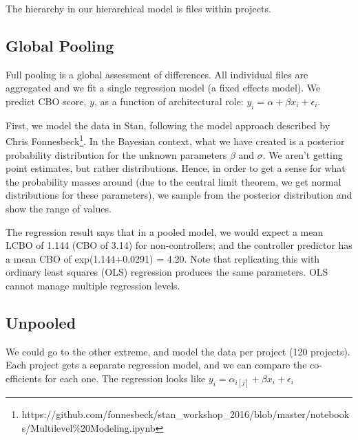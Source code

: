 \documentclass[sigconf,natbib=false]{acmart}
\begin{document}
The hierarchy in our hierarchical model is files within projects.  

\subsection{Global Pooling}
Full pooling is a global assessment of differences. All individual files are aggregated and we fit a single regression model (a fixed effects model). We predict CBO score, $y$, as a function of architectural role: 
$ y_i = \alpha + \beta x_i + \epsilon_i$.

First, we model the data in Stan, following the model approach described by Chris Fonnesbeck\footnote{https://github.com/fonnesbeck/stan\_workshop\_2016/blob/master/notebooks/Multilevel\%20Modeling.ipynb}. In the Bayesian context, what we have created is a posterior probability distribution for the unknown parameters $\beta$ and $\sigma$. We aren't getting point estimates, but rather distributions. Hence, in order to get a sense for what the probability masses around (due to the central limit theorem, we get normal distributions for these parameters), we sample from the posterior distribution and show the range of values.

The regression result says that in a pooled model, we would expect a mean LCBO of 1.144 (CBO of 3.14) for non-controllers; and the controller predictor has a mean CBO of \textsf{exp(1.144+0.0291) = 4.20}. Note that replicating this with ordinary least squares (OLS) regression produces the same parameters. OLS cannot manage multiple regression levels.


\subsection{Unpooled}
We could go to the other extreme, and model the data per project (120 projects). Each project gets a separate regression model, and we can compare the co-efficients for each one. The regression looks like $y_i = \alpha_{i[j]} + \beta x_i + \epsilon_i $
\end{document}
